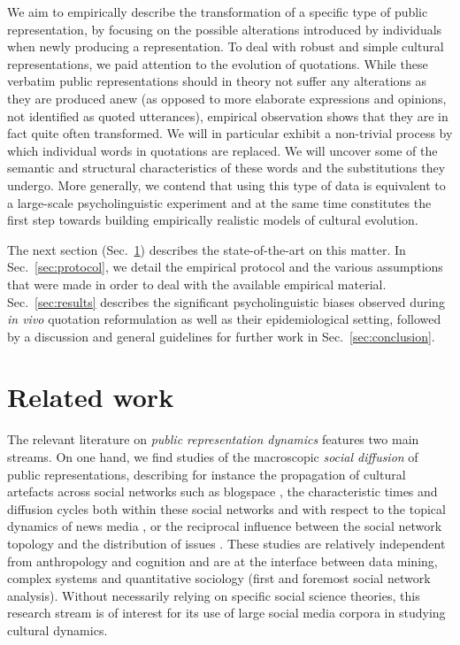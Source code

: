 We aim to empirically describe the transformation of a specific type of public representation, by focusing on the possible alterations introduced by individuals when newly producing a representation.
To deal with robust and simple cultural representations, we paid attention to the evolution of quotations.
While these verbatim public representations should in theory not suffer any alterations as they are produced anew (as opposed to more elaborate expressions and opinions, not identified as quoted utterances), empirical observation shows that they are in fact quite often transformed.
We will in particular exhibit a non-trivial process by which individual words in quotations are replaced.
We will uncover some of the semantic and structural characteristics of these words and the substitutions they undergo.
More generally, we contend that using this type of data is equivalent to a large-scale psycholinguistic experiment and at the same time constitutes the first step towards building empirically realistic models of cultural evolution.

The next section (Sec.~\ref{sec:related}) describes the state-of-the-art on this matter.
In Sec.~\ref{sec:protocol}, we detail the empirical protocol and the various assumptions that were made in order to deal with the available empirical material.
Sec.~\ref{sec:results} describes the significant psycholinguistic biases observed during \emph{in vivo} quotation reformulation as well as their epidemiological setting, followed by a discussion and general guidelines for further work in Sec.~\ref{sec:conclusion}.

\section{Related work} %
\label{sec:related}

The relevant literature on \emph{public representation dynamics} features two main streams.
On one hand, we find studies of the macroscopic \emph{social diffusion} of public representations, describing for instance the propagation of cultural artefacts across social networks such as blogspace \citep{Gruhl04}, the characteristic times and diffusion cycles both within these social networks and with respect to the topical dynamics of news media \citep{Leskovec09}, or the reciprocal influence between the social network topology and the distribution of issues \citep{Cointet09}.
These studies are relatively independent from anthropology and cognition and are at the interface between data mining, complex systems and quantitative sociology (first and foremost social network analysis).
Without necessarily relying on specific social science theories, this research stream is of interest for its use of large social media corpora in studying cultural dynamics.
 
